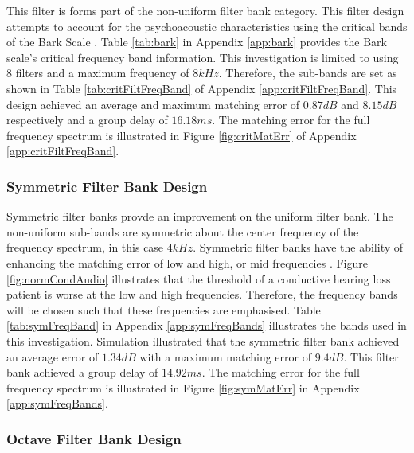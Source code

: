 \documentclass[11pt,onecolumn]{witseiepaper}
\begin{document}
\noindent This filter is forms part of the non-uniform filter bank category. This filter design attempts to account for the psychoacoustic characteristics using the critical bands of the Bark Scale \cite{chong}. Table \ref{tab:bark} in Appendix \ref{app:bark} provides the Bark scale's critical frequency band information. This investigation is limited to using $8$ filters and a maximum frequency of $8kHz$. Therefore, the sub-bands are set as shown in Table \ref{tab:critFiltFreqBand} of Appendix \ref{app:critFiltFreqBand}.	This design achieved an average and maximum matching error of $0.87dB$ and $8.15dB$ respectively and a group delay of $16.18ms$. The matching error for the full frequency spectrum is illustrated in Figure \ref{fig:critMatErr} of Appendix \ref{app:critFiltFreqBand}.


\subsubsection{Symmetric Filter Bank Design}
\label{sec:symmDesign}

\noindent Symmetric filter banks provde an improvement on the uniform filter bank. The non-uniform sub-bands are symmetric about the center frequency of the frequency spectrum, in this case $4kHz$. Symmetric filter banks have the ability of enhancing the matching error of low and high, or mid frequencies \cite{sebastian}. Figure \ref{fig:normCondAudio} illustrates that the threshold of a conductive hearing loss patient is worse at the low and high frequencies. Therefore, the frequency bands will be chosen such that these frequencies are emphasised. Table \ref{tab:symFreqBand} in Appendix \ref{app:symFreqBands} illustrates the bands used in this investigation. Simulation illustrated that the symmetric filter bank achieved an average error of $1.34dB$ with a maximum matching error of $9.4dB$. This filter bank achieved a group delay of $14.92ms$. The matching error for the full frequency spectrum is illustrated in Figure \ref{fig:symMatErr} in Appendix \ref{app:symFreqBands}.


\subsubsection{Octave Filter Bank Design}
\label{sec:octDesign}
\end{document}
